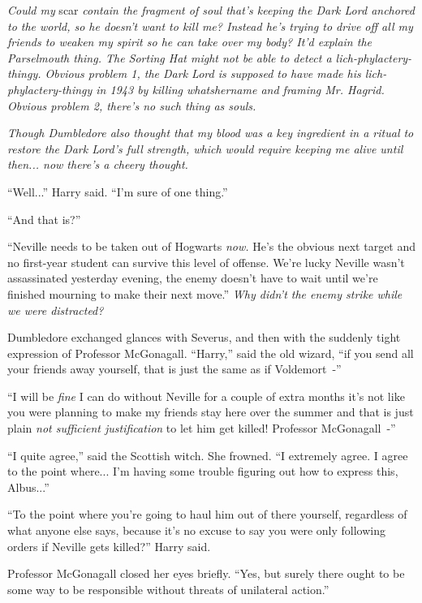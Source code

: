 \emph{Could my} scar \emph{contain the fragment of soul that's keeping the Dark Lord anchored to the world, so he doesn't want to kill me? Instead he's trying to drive off all my friends to weaken my spirit so he can take over my body? It'd explain the Parselmouth thing. The Sorting Hat might not be able to detect a lich-phylactery-thingy. Obvious problem 1, the Dark Lord is supposed to have made his lich-phylactery-thingy in 1943 by killing whatshername and framing Mr. Hagrid. Obvious problem 2, there's no such thing as souls.}

\emph{Though Dumbledore also thought that my blood was a key ingredient in a ritual to restore the Dark Lord's full strength, which would require keeping me alive until then... now there's a cheery thought.}

``Well...'' Harry said. ``I'm sure of one thing.''

``And that is?''

``Neville needs to be taken out of Hogwarts \emph{now.} He's the obvious next target and no first-year student can survive this level of offense. We're lucky Neville wasn't assassinated yesterday evening, the enemy doesn't have to wait until we're finished mourning to make their next move.'' \emph{Why didn't the enemy strike while we were distracted?}

Dumbledore exchanged glances with Severus, and then with the suddenly tight expression of Professor McGonagall. ``Harry,'' said the old wizard, ``if you send all your friends away yourself, that is just the same as if Voldemort~-''

``I will be \emph{fine} I can do without Neville for a couple of extra months it's not like you were planning to make my friends stay here over the summer and that is just plain \emph{not sufficient justification} to let him get killed! Professor McGonagall~-''

``I quite agree,'' said the Scottish witch. She frowned. ``I extremely agree. I agree to the point where... I'm having some trouble figuring out how to express this, Albus...''

``To the point where you're going to haul him out of there yourself, regardless of what anyone else says, because it's no excuse to say you were only following orders if Neville gets killed?'' Harry said.

Professor McGonagall closed her eyes briefly. ``Yes, but surely there ought to be some way to be responsible without threats of unilateral action.''

